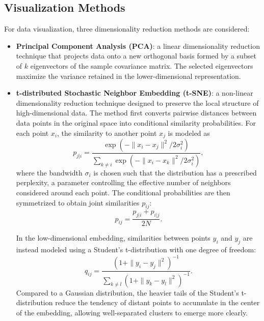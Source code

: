 \documentclass[prl,twocolumn]{revtex4-1}
\begin{document}
\subsection{Visualization Methods}
\vspace{-1em}
\noindent For data visualization, three dimensionality reduction methods are considered:
\vspace{-0.5em}
\begin{itemize}[leftmargin=0pt, itemsep=0pt]
    \item[] \textbf{Principal Component Analysis (PCA)}:
    a linear dimensionality reduction technique that projects data onto a new orthogonal basis formed by a subset of $k$ eigenvectors of the sample covariance matrix.
    The selected eigenvectors maximize the variance retained in the lower-dimensional representation.

    \item[] \textbf{t-distributed Stochastic Neighbor Embedding (t-SNE)}:
    a non-linear dimensionality reduction technique designed to preserve the local structure of high-dimensional data.
    The method first converts pairwise distances between data points in the original space into conditional similarity probabilities.
    For each point $x_i$, the similarity to another point $x_j$ is modeled as
    \begin{equation}
        p_{j|i} = \frac{\exp \left( -\|x_i - x_j\|^2 / 2\sigma_i^2 \right)}
        {\sum_{k \neq i} \exp \left( -\|x_i - x_k\|^2 / 2\sigma_i^2 \right)},
    \end{equation}
    where the bandwidth $\sigma_i$ is chosen such that the distribution has a prescribed perplexity, a parameter controlling the effective number of neighbors considered around each point.
    The conditional probabilities are then symmetrized to obtain joint similarities $p_{ij}$:
    \begin{equation}
        p_{ij} = \frac{p_{j|i} + p_{i|j}}{2N}.
    \end{equation}

    In the low-dimensional embedding, similarities between points $y_i$ and $y_j$ are instead modeled using a Student's t-distribution with one degree of freedom:
    \begin{equation}
        q_{ij} =
        \frac{\left(1+\|y_i-y_j\|^2\right)^{-1}}
        {\sum_{k \neq l}\left(1+\|y_k-y_l\|^2\right)^{-1}}.
    \end{equation}
    Compared to a Gaussian distribution, the heavier tails of the Student's t-distribution reduce the tendency of distant points to accumulate in the center of the embedding, allowing well-separated clusters to emerge more clearly.


\end{itemize}
\end{document}
